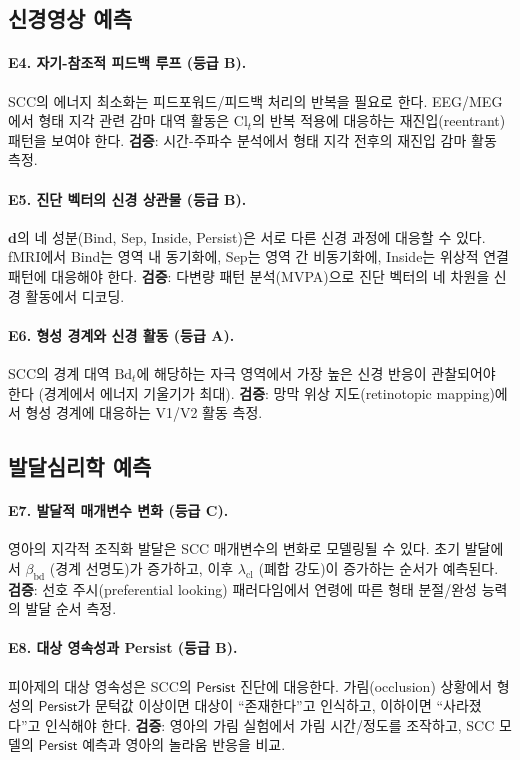 \subsection{신경영상 예측}

\paragraph{E4. 자기-참조적 피드백 루프 (등급 B).}
SCC의 에너지 최소화는 피드포워드/피드백 처리의 반복을 필요로 한다. EEG/MEG에서 형태 지각 관련 감마 대역 활동은 $\mathrm{Cl}_t$의 반복 적용에 대응하는 재진입(reentrant) 패턴을 보여야 한다. \textbf{검증}: 시간-주파수 분석에서 형태 지각 전후의 재진입 감마 활동 측정.

\paragraph{E5. 진단 벡터의 신경 상관물 (등급 B).}
$\mathbf{d}$의 네 성분(Bind, Sep, Inside, Persist)은 서로 다른 신경 과정에 대응할 수 있다. fMRI에서 Bind는 영역 내 동기화에, Sep는 영역 간 비동기화에, Inside는 위상적 연결 패턴에 대응해야 한다. \textbf{검증}: 다변량 패턴 분석(MVPA)으로 진단 벡터의 네 차원을 신경 활동에서 디코딩.

\paragraph{E6. 형성 경계와 신경 활동 (등급 A).}
SCC의 경계 대역 $\mathrm{Bd}_t$에 해당하는 자극 영역에서 가장 높은 신경 반응이 관찰되어야 한다 (경계에서 에너지 기울기가 최대). \textbf{검증}: 망막 위상 지도(retinotopic mapping)에서 형성 경계에 대응하는 V1/V2 활동 측정.

\subsection{발달심리학 예측}

\paragraph{E7. 발달적 매개변수 변화 (등급 C).}
영아의 지각적 조직화 발달은 SCC 매개변수의 변화로 모델링될 수 있다. 초기 발달에서 $\beta_{\mathrm{bd}}$ (경계 선명도)가 증가하고, 이후 $\lambda_{\mathrm{cl}}$ (폐합 강도)이 증가하는 순서가 예측된다. \textbf{검증}: 선호 주시(preferential looking) 패러다임에서 연령에 따른 형태 분절/완성 능력의 발달 순서 측정.

\paragraph{E8. 대상 영속성과 Persist (등급 B).}
피아제의 대상 영속성은 SCC의 $\mathsf{Persist}$ 진단에 대응한다. 가림(occlusion) 상황에서 형성의 $\mathsf{Persist}$가 문턱값 이상이면 대상이 ``존재한다''고 인식하고, 이하이면 ``사라졌다''고 인식해야 한다. \textbf{검증}: 영아의 가림 실험에서 가림 시간/정도를 조작하고, SCC 모델의 $\mathsf{Persist}$ 예측과 영아의 놀라움 반응을 비교.

